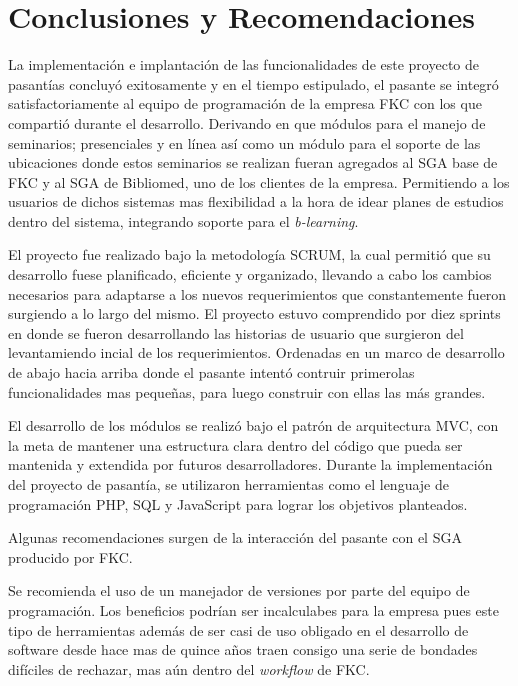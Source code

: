 \chapter*{Conclusiones y Recomendaciones}
\thispagestyle{empty} %
 

La implementación e implantación de las funcionalidades de este proyecto de pasantías concluyó exitosamente y en el tiempo estipulado, el pasante se integró satisfactoriamente al equipo de programación de la empresa FKC con los que compartió durante el desarrollo. Derivando en que módulos para el manejo de seminarios; presenciales y en línea así como un módulo para el soporte de las ubicaciones donde estos seminarios se realizan fueran agregados al SGA base de FKC y al SGA de Bibliomed, uno de los clientes de la empresa. Permitiendo a los usuarios de dichos sistemas mas flexibilidad a la hora de idear planes de estudios dentro del sistema, integrando soporte para el \emph{b-learning}.

El proyecto fue realizado bajo la metodología SCRUM, la cual permitió que su desarrollo fuese planificado, eficiente y organizado, llevando a cabo los cambios necesarios para adaptarse a los nuevos requerimientos que constantemente fueron surgiendo a lo largo del mismo. El proyecto estuvo comprendido por diez sprints en donde se fueron desarrollando las historias de usuario que surgieron del levantamiendo incial de los requerimientos. Ordenadas en un marco de desarrollo de abajo hacia arriba donde el pasante intentó contruir primerolas funcionalidades mas pequeñas, para luego construir con ellas las más grandes.

El desarrollo de los módulos se realizó bajo el patrón de arquitectura MVC, con la meta de mantener una estructura clara dentro del código que pueda ser mantenida y extendida por futuros desarrolladores. Durante la implementación del proyecto de pasantía, se utilizaron herramientas como el lenguaje de programación PHP, SQL y JavaScript para lograr los objetivos planteados.

Algunas recomendaciones surgen de la interacción del pasante con el SGA producido por FKC.

Se recomienda el uso de un manejador de versiones por parte del equipo de programación. Los beneficios podrían ser incalculabes para la empresa pues este tipo de herramientas además de ser casi de uso obligado en el desarrollo de software desde hace mas de quince años traen consigo una serie de bondades difíciles de rechazar, mas aún dentro del \emph{workflow} de FKC. 

